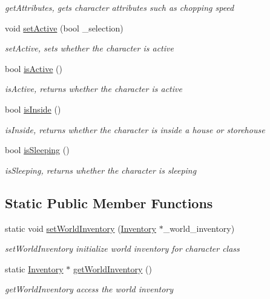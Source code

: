 \begin{DoxyCompactItemize}
\begin{DoxyCompactList}\small\item\em get\+Attributes, gets character attributes such as chopping speed \end{DoxyCompactList}\item 
void \hyperlink{class_character_a399c75ca04b861582dd97cdf50978074}{set\+Active} (bool \+\_\+selection)
\begin{DoxyCompactList}\small\item\em set\+Active, set\textquotesingle{}s whether the character is active \end{DoxyCompactList}\item 
bool \hyperlink{class_character_a86a42d1371382e19a4831417a8eb439c}{is\+Active} ()
\begin{DoxyCompactList}\small\item\em is\+Active, returns whether the character is active \end{DoxyCompactList}\item 
bool \hyperlink{class_character_af2a22fd6b342859673bb27f5998b4f6b}{is\+Inside} ()
\begin{DoxyCompactList}\small\item\em is\+Inside, returns whether the character is inside a house or storehouse \end{DoxyCompactList}\item 
bool \hyperlink{class_character_aed1f1ccd18955f23108cb48f617f8d67}{is\+Sleeping} ()
\begin{DoxyCompactList}\small\item\em is\+Sleeping, returns whether the character is sleeping \end{DoxyCompactList}\end{DoxyCompactItemize}
\subsection*{Static Public Member Functions}
\begin{DoxyCompactItemize}
\item 
static void \hyperlink{class_character_a961d6ebca6a368528125a6ed74c6c436}{set\+World\+Inventory} (\hyperlink{class_inventory}{Inventory} $\ast$\+\_\+world\+\_\+inventory)
\begin{DoxyCompactList}\small\item\em set\+World\+Inventory initialize world inventory for character class \end{DoxyCompactList}\item 
static \hyperlink{class_inventory}{Inventory} $\ast$ \hyperlink{class_character_ad70ae7763ddd87f93edcccca86c0c5ed}{get\+World\+Inventory} ()
\begin{DoxyCompactList}\small\item\em get\+World\+Inventory access the world inventory \end{DoxyCompactList}\end{DoxyCompactItemize}
